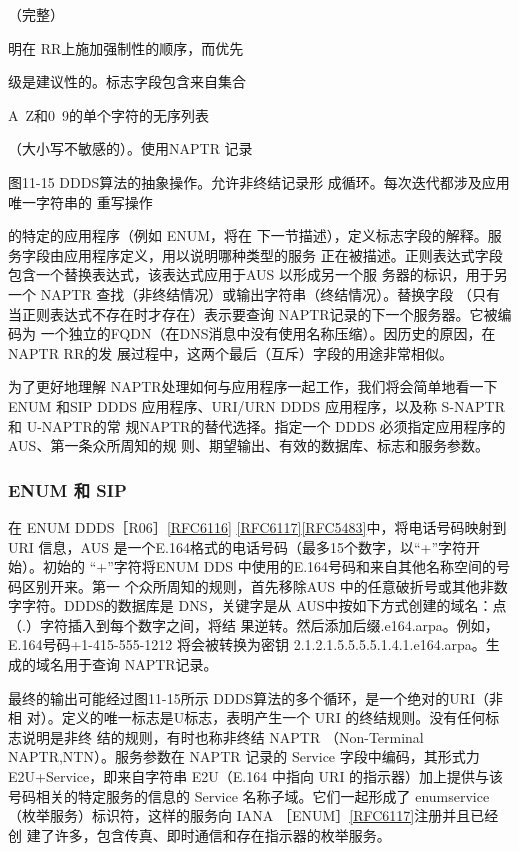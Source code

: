 （完整）

明在 RR上施加强制性的顺序，而优先

级是建议性的。标志字段包含来自集合

A~Z和0~9的单个字符的无序列表

（大小写不敏感的）。使用NAPTR 记录

图11-15
DDDS算法的抽象操作。允许非终结记录形
成循环。每次迭代都涉及应用唯一字符串的
重写操作

的特定的应用程序（例如 ENUM，将在
下一节描述），定义标志字段的解释。服务字段由应用程序定义，用以说明哪种类型的服务
正在被描述。正则表达式字段包含一个替换表达式，该表达式应用于AUS 以形成另一个服
务器的标识，用于另一个 NAPTR 查找（非终结情况）或输出字符串（终结情况）。替换字段
（只有当正则表达式不存在时才存在）表示要查询 NAPTR记录的下一个服务器。它被编码为
一个独立的FQDN（在DNS消息中没有使用名称压缩）。因历史的原因，在NAPTR RR的发
展过程中，这两个最后（互斥）字段的用途非常相似。

为了更好地理解 NAPTR处理如何与应用程序一起工作，我们将会简单地看一下 ENUM
和SIP DDDS 应用程序、URI/URN DDDS 应用程序，以及称 S-NAPTR 和 U-NAPTR的常
规NAPTR的替代选择。指定一个 DDDS 必须指定应用程序的AUS、第一条众所周知的规
则、期望输出、有效的数据库、标志和服务参数。

\subsubsection{ENUM 和 SIP}

在 ENUM DDDS［R06］\href{https://www.rfc-editor.org/rfc/rfc6116}{[RFC6116]} \href{https://www.rfc-editor.org/rfc/rfc6117}{[RFC6117]}\href{https://www.rfc-editor.org/rfc/rfc5483}{[RFC5483]}中，将电话号码映射到URI
信息，AUS 是一个E.164格式的电话号码（最多15个数字，以“+”字符开始）。初始的
“+”字符将ENUM DDS 中使用的E.164号码和来自其他名称空间的号码区别开来。第一
个众所周知的规则，首先移除AUS 中的任意破折号或其他非数字字符。DDDS的数据库是
DNS，关键字是从 AUS中按如下方式创建的域名：点（.）字符插入到每个数字之间，将结
果逆转。然后添加后缀.e164.arpa。例如，E.164号码+1-415-555-1212 将会被转换为密钥
2.1.2.1.5.5.5.5.1.4.1.e164.arpa。生成的域名用于查询 NAPTR记录。

最终的输出可能经过图11-15所示 DDDS算法的多个循环，是一个绝对的URI（非相
对）。定义的唯一标志是U标志，表明产生一个 URI 的终结规则。没有任何标志说明是非终
结的规则，有时也称非终结 NAPTR （Non-Terminal NAPTR,NTN）。服务参数在 NAPTR
记录的 Service 字段中编码，其形式力 E2U+Service，即来自字符串 E2U（E.164 中指向 URI
的指示器）加上提供与该号码相关的特定服务的信息的 Service 名称子域。它们一起形成了
enumservice（枚举服务）标识符，这样的服务向 IANA ［ENUM］\href{https://www.rfc-editor.org/rfc/rfc6117}{[RFC6117]}注册并且已经创
建了许多，包含传真、即时通信和存在指示器的枚举服务。

